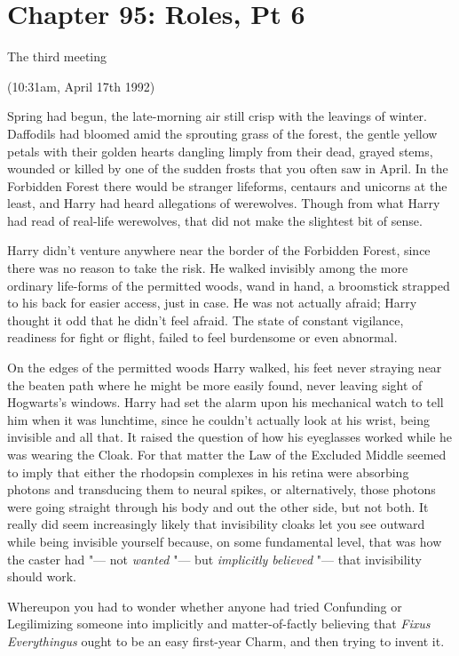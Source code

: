 \chapter{Chapter 95: Roles, Pt 6}
The third meeting

(10:31am, April 17th 1992)

Spring had begun, the late-morning air still crisp with the leavings of
winter. Daffodils had bloomed amid the sprouting grass of the forest,
the gentle yellow petals with their golden hearts dangling limply from
their dead, grayed stems, wounded or killed by one of the sudden frosts
that you often saw in April. In the Forbidden Forest there would be
stranger lifeforms, centaurs and unicorns at the least, and Harry had
heard allegations of werewolves. Though from what Harry had read of
real-life werewolves, that did not make the slightest bit of sense.

Harry didn't venture anywhere near the border of the Forbidden Forest,
since there was no reason to take the risk. He walked invisibly among
the more ordinary life-forms of the permitted woods, wand in hand, a
broomstick strapped to his back for easier access, just in case. He was
not actually afraid; Harry thought it odd that he didn't feel afraid.
The state of constant vigilance, readiness for fight or flight, failed
to feel burdensome or even abnormal.

On the edges of the permitted woods Harry walked, his feet never
straying near the beaten path where he might be more easily found, never
leaving sight of Hogwarts's windows. Harry had set the alarm upon his
mechanical watch to tell him when it was lunchtime, since he couldn't
actually look at his wrist, being invisible and all that. It raised the
question of how his eyeglasses worked while he was wearing the Cloak.
For that matter the Law of the Excluded Middle seemed to imply that
either the rhodopsin complexes in his retina were absorbing photons and
transducing them to neural spikes, or alternatively, those photons were
going straight through his body and out the other side, but not both. It
really did seem increasingly likely that invisibility cloaks let you see
outward while being invisible yourself because, on some fundamental
level, that was how the caster had "--- not \emph{wanted} "--- but
\emph{implicitly believed} "--- that invisibility should work.

Whereupon you had to wonder whether anyone had tried Confunding or
Legilimizing someone into implicitly and matter-of-factly believing that
\emph{Fixus Everythingus} ought to be an easy first-year Charm, and then
trying to invent it.

